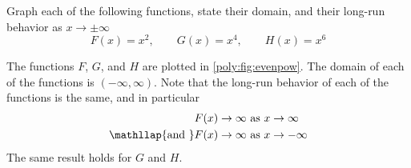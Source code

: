 	 \begin{pccexample}\label{poly:ex:evenpow}%
		 Graph each of the following functions, state their domain, and their
		 long-run behavior as $x\rightarrow\pm\infty$
		 \[
			 F(x)=x^2, \qquad G(x)=x^4, \qquad H(x)=x^6
		 \]
		 \begin{pccsolution}
			 The functions $F$, $G$, and $H$ are plotted in \cref{poly:fig:evenpow}. The domain
			 of each of the functions is $(-\infty,\infty)$. Note that the long-run behavior
			 of each of the functions is the same, and in particular
			 \begin{align*}
				 F(x)\rightarrow\infty                          & \text{ as } x\rightarrow\infty  \\
				 \mathllap{\text{and }}   F(x)\rightarrow\infty & \text{ as } x\rightarrow-\infty
			 \end{align*}
			 The same result holds for $G$ and $H$.
		 \end{pccsolution}
	 \end{pccexample}

